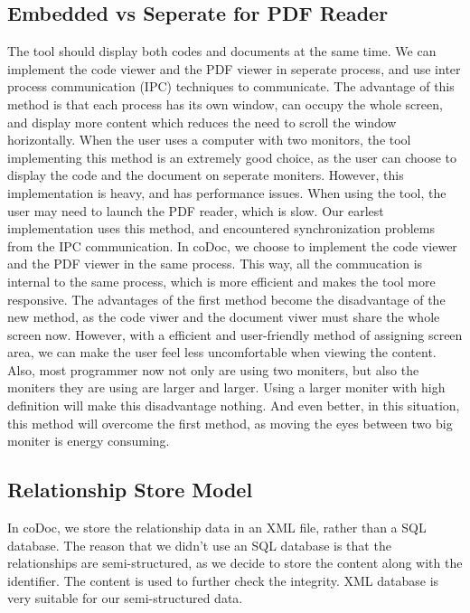 \documentclass[11pt,letterpaper,oneside]{article}
\begin{document}
\subsection{Embedded vs Seperate for PDF Reader}
The tool should display both codes and documents at the same time.
We can implement the code viewer and the PDF viewer in seperate process,
and use inter process communication (IPC) techniques to communicate.
The advantage of this method is that each process has its own window,
can occupy the whole screen,
and display more content which reduces the need to scroll the window horizontally.
When the user uses a computer with two monitors,
the tool implementing this method is an extremely good choice,
as the user can choose to display the code and the document on seperate moniters.
However, this implementation is heavy, %
and has performance issues.
When using the tool, 
the user may need to launch the PDF reader,
which is slow.
Our earlest implementation uses this method,
and encountered synchronization problems from the IPC communication.
In coDoc, we choose to implement the code viewer and the PDF viewer in the same process.
This way, all the commucation is internal to the same process,
which is more efficient and makes the tool more responsive.
The advantages of the first method become the disadvantage of the new method,
as the code viwer and the document viwer must share the whole screen now.
However, with a efficient and user-friendly method of assigning screen area,
we can make the user feel less uncomfortable when viewing the content.
Also, most programmer now not only are using two moniters, %
but also the moniters they are using are larger and larger.
Using a larger moniter with high definition will make this disadvantage nothing. %
And even better, in this situation, this method will overcome the first method,
as moving the eyes between two big moniter is energy consuming.

\subsection{Relationship Store Model}
In coDoc, we store the relationship data in an XML file, 
rather than a SQL database.
The reason that we didn't use an SQL database is that the relationships are semi-structured,
as we decide to store the content along with the identifier.
The content is used to further check the integrity.
XML database is very suitable for our semi-structured data. %
\end{document}
